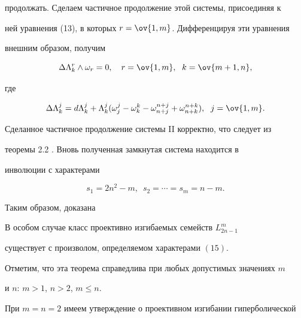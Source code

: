 продолжать. Сделаем частичное продолжение этой системы, присоединяя к 


ней уравнения (13), в которых $r=\ov{1,m}$. Дифференцируя эти уравнения 


внешним образом, получим 


\begin{equation} 


\Delta\Lambda^r_k\wedge\omega_r=0,\quad 


r=\ov{1,m}, \ \; k=\ov{m+1,n}, 


\end{equation} 


где 


$$ 


\Delta\Lambda^j_k=d \Lambda^j_k+\Lambda^j_k 


(\omega^j_j-\omega^k_k-\omega^{n+j}_{n+j}+ 


\omega^{n+k}_{n+k}),\ \; j=\ov{1,m}. 


$$ 


Сделанное частичное продолжение системы II корректно, что следует из 


теоремы 2.2 \cite{3}. Вновь полученная замкнутая система находится в 


инволюции с характерами 


\begin{equation} 


s_1=2n^2-m,\ \; s_2=\dotsb=s_m=n-m. 


\end{equation} 


Таким образом, доказана 


 


\begin{thm} 


В особом случае класс проективно изгибаемых семейств $L^m_{2n-1}$ 


существует с произволом, определяемом характерами $(15)$. 


\end{thm} 


 


Отметим, что эта теорема справедлива при любых допустимых значениях $m$ 


и $n$: $m>1$, $n>2$, $m\le n$. 


 


При $m=n=2$ имеем утверждение о проективном изгибании гиперболической 


